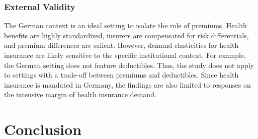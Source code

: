 \documentclass[a4paper, 11pt, english]{article}
\begin{document}
\subsubsection*{External Validity}

The German context is an ideal setting to isolate the role of premiums. Health benefits are highly standardized, insurers are compensated for risk differentials, and premium differences are salient. However, demand elasticities for health insurance are likely sensitive to the specific institutional context. For example, the German setting does not feature deductibles. Thus, the study does not apply to settings with a trade-off between premiums and deductibles. Since health insurance is mandated in Germany, the findings are also limited to responses on the intensive margin of health insurance demand.





\section{Conclusion \label{sec:discussion}}
\end{document}
